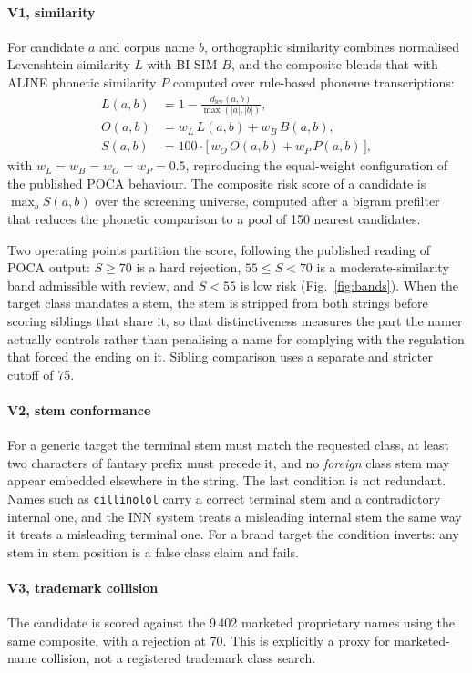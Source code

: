 \documentclass[conference]{IEEEtran}
\newcommand{\code}[1]{\texttt{\footnotesize #1}}
\begin{document}
\paragraph{V1, similarity}
For candidate $a$ and corpus name $b$, orthographic similarity combines
normalised Levenshtein similarity $L$ with BI-SIM $B$, and the composite blends
that with ALINE phonetic similarity $P$ computed over rule-based phoneme
transcriptions:
\begin{align}
L(a,b) &= 1 - \frac{d_{\mathrm{lev}}(a,b)}{\max(|a|,|b|)}, \\
O(a,b) &= w_{L}\,L(a,b) + w_{B}\,B(a,b), \\
S(a,b) &= 100 \cdot \big[\, w_{O}\,O(a,b) + w_{P}\,P(a,b) \,\big],
\end{align}
with $w_L = w_B = w_O = w_P = 0.5$, reproducing the equal-weight configuration
of the published POCA behaviour. The composite risk score of a candidate is
$\max_b S(a,b)$ over the screening universe, computed after a bigram prefilter
that reduces the phonetic comparison to a pool of 150 nearest candidates.

Two operating points partition the score, following the published reading of
POCA output: $S \geq 70$ is a hard rejection, $55 \leq S < 70$ is a
moderate-similarity band admissible with review, and $S < 55$ is low risk
(Fig.~\ref{fig:bands}). When the target class mandates a stem, the stem is
stripped from both strings before scoring siblings that share it, so that
distinctiveness measures the part the namer actually controls rather than
penalising a name for complying with the regulation that forced the ending on
it. Sibling comparison uses a separate and stricter cutoff of 75.

\paragraph{V2, stem conformance}
For a generic target the terminal stem must match the requested class, at least
two characters of fantasy prefix must precede it, and no \emph{foreign} class
stem may appear embedded elsewhere in the string. The last condition is not
redundant. Names such as \code{cillinolol} carry a correct terminal stem and a
contradictory internal one, and the INN system treats a misleading internal stem
the same way it treats a misleading terminal one. For a brand target the
condition inverts: any stem in stem position is a false class claim and fails.

\paragraph{V3, trademark collision}
The candidate is scored against the 9\,402 marketed proprietary names using the
same composite, with a rejection at 70. This is explicitly a proxy for
marketed-name collision, not a registered trademark class search.
\end{document}
